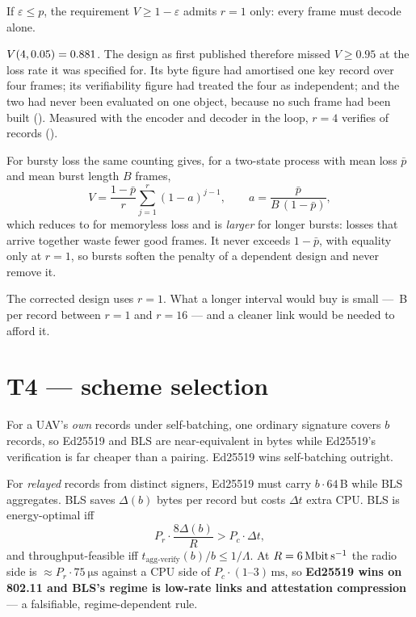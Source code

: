 \begin{corollary}
If $\varepsilon \leq p$, the requirement $V \geq 1 - \varepsilon$ admits $r = 1$ only: every
frame must decode alone.
\end{corollary}

$V(4, 0.05) = 0.881$. The design as first published therefore missed $V \geq 0.95$ at the
loss rate it was specified for. Its byte figure had amortised one key record over four frames; its
verifiability figure had treated the four as independent; and the two had never been evaluated
on one object, because no such frame had been built (). Measured with
the encoder and decoder in the loop, $r = 4$ verifies \lossVFour{} of records
().

For bursty loss the same counting gives, for a two-state process with mean loss $\bar{p}$ and
mean burst length $B$ frames,
\[
V = \frac{1 - \bar{p}}{r} \sum_{j=1}^{r} (1 - a)^{j-1}, \qquad a = \frac{\bar{p}}{B\,(1 - \bar{p})},
\]
which reduces to  for memoryless loss and is \emph{larger} for longer bursts:
losses that arrive together waste fewer good frames. It never exceeds $1 - \bar{p}$, with
equality only at $r = 1$, so bursts soften the penalty of a dependent design and never remove it.

The corrected design uses $r = 1$. What a longer interval would buy is small --- \lossPrize\,B
per record between $r = 1$ and $r = 16$ --- and a cleaner link would be needed to afford it.

\section{T4 --- scheme selection}\label{sec:t4}

For a UAV's \emph{own} records under self-batching, one ordinary signature covers $b$ records, so
Ed25519 and BLS are near-equivalent in bytes while Ed25519's verification is far cheaper than a
pairing. Ed25519 wins self-batching outright.

For \emph{relayed} records from distinct signers, Ed25519 must carry $b \cdot 64$\,B while BLS
aggregates. BLS saves $\Delta(b)$ bytes per record but costs $\Delta t$ extra CPU. BLS is
energy-optimal iff
\[
P_r \cdot \frac{8\Delta(b)}{R} > P_c \cdot \Delta t,
\]
and throughput-feasible iff $t_{\mathrm{agg\text{-}verify}}(b)/b \leq 1/\Lambda$. At
$R = \SI{6}{\mega\bit\per\second}$ the radio side is $\approx P_r \cdot \SI{75}{\micro\second}$
against a CPU side of $P_c \cdot (1\text{--}3)\,\si{\milli\second}$, so \textbf{Ed25519 wins on
802.11 and BLS's regime is low-rate links and attestation compression} --- a falsifiable,
regime-dependent rule.

